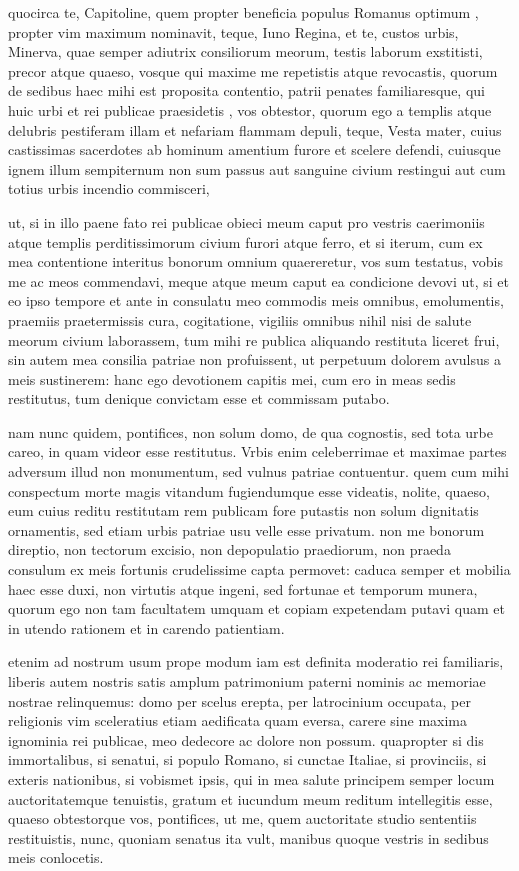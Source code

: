  quocirca te, Capitoline, quem propter beneficia populus Romanus optimum , propter vim maximum nominavit, teque, Iuno Regina, et te, custos urbis, Minerva, quae semper adiutrix consiliorum meorum, testis laborum exstitisti, precor atque quaeso, vosque qui maxime me repetistis atque revocastis, quorum de sedibus haec mihi est proposita contentio, patrii penates familiaresque, qui huic urbi et rei publicae praesidetis , vos obtestor, quorum ego a templis atque delubris pestiferam illam et nefariam flammam depuli, teque, Vesta mater, cuius castissimas sacerdotes ab hominum amentium furore et scelere defendi, cuiusque ignem illum sempiternum non sum passus aut sanguine civium restingui aut cum totius urbis incendio commisceri,

 ut, si in illo paene fato rei publicae obieci meum caput pro vestris caerimoniis atque templis perditissimorum civium furori atque ferro, et si iterum, cum ex mea contentione interitus bonorum omnium quaereretur, vos sum testatus, vobis me ac meos commendavi, meque atque meum caput ea condicione devovi ut, si et eo ipso tempore et ante in consulatu meo commodis meis omnibus, emolumentis, praemiis praetermissis cura, cogitatione, vigiliis omnibus nihil nisi de salute meorum civium laborassem, tum mihi re publica aliquando restituta liceret frui, sin autem mea consilia patriae non profuissent, ut perpetuum dolorem avulsus a meis sustinerem: hanc ego devotionem capitis mei, cum ero in meas sedis restitutus, tum denique convictam esse et commissam putabo.

 nam nunc quidem, pontifices, non solum domo, de qua cognostis, sed tota urbe careo, in quam videor esse restitutus. Vrbis enim celeberrimae et maximae partes adversum illud non monumentum, sed vulnus patriae contuentur. quem cum mihi conspectum morte magis vitandum fugiendumque esse videatis, nolite, quaeso, eum cuius reditu restitutam rem publicam fore putastis non solum dignitatis ornamentis, sed etiam urbis patriae usu velle esse privatum. non me bonorum direptio, non tectorum excisio, non depopulatio praediorum, non praeda consulum ex meis fortunis crudelissime capta permovet: caduca semper et mobilia haec esse duxi, non virtutis atque ingeni, sed fortunae et temporum munera, quorum ego non tam facultatem umquam et copiam expetendam putavi quam et in utendo rationem et in carendo patientiam.

 etenim ad nostrum usum prope modum iam est definita moderatio rei familiaris, liberis autem nostris satis amplum patrimonium paterni nominis ac memoriae nostrae relinquemus: domo per scelus erepta, per latrocinium occupata, per religionis vim sceleratius etiam aedificata quam eversa, carere sine maxima ignominia rei publicae, meo dedecore ac dolore non possum. quapropter si dis immortalibus, si senatui, si populo Romano, si cunctae Italiae, si provinciis, si exteris nationibus, si vobismet ipsis, qui in mea salute principem semper locum auctoritatemque tenuistis, gratum et iucundum meum reditum intellegitis esse, quaeso obtestorque vos, pontifices, ut me, quem auctoritate studio sententiis restituistis, nunc, quoniam senatus ita vult, manibus quoque vestris in sedibus meis conlocetis.
